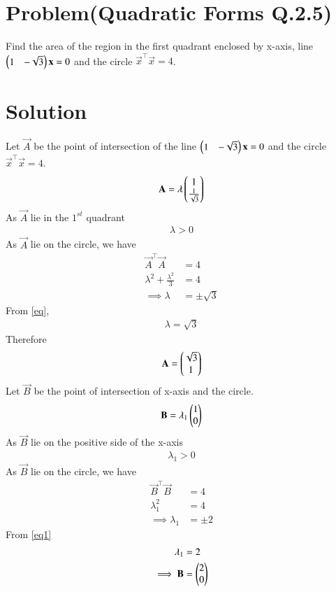 \documentclass[journal,12pt,twocolumn]{IEEEtran}
\begin{document}
\section{Problem(Quadratic Forms Q.2.5)}
Find the area of the region in the first quadrant enclosed by x-axis, line $\begin{pmatrix}1 & -\sqrt{3}\end{pmatrix}\mathbf{x}=0$ and the circle $\vec{x}^\top\vec{x}=4$.
\section{Solution}
Let $\vec{A}$ be the point of intersection of the line $\begin{pmatrix}1 & -\sqrt{3}\end{pmatrix}\mathbf{x}=0$ and the circle $\vec{x}^\top\vec{x}=4$.
\begin{align}
    \mathbf{A}=\lambda\begin{pmatrix}1\\ \frac{1}{\sqrt{3}}\end{pmatrix}
\end{align}
As $\vec{A}$ lie in the $1^{st}$ quadrant
\begin{align}
\label{eq}
    \lambda > 0
\end{align}
As $\vec{A}$ lie on the circle, we have
\begin{align}
    \vec{A}^\top\vec{A}&=4\\
    \lambda^2+\frac{\lambda^2}{3}&=4\\
    \implies \lambda&=\pm \sqrt{3} 
\end{align}
From \ref{eq},
\begin{align}
    \lambda = \sqrt{3}
\end{align}
Therefore 
\begin{align}
    \mathbf{A}=\begin{pmatrix}\sqrt{3}\\1\end{pmatrix}
\end{align}
Let $\vec{B}$ be the point of intersection of x-axis and the circle.
\begin{align}
    \mathbf{B}=\lambda_1\begin{pmatrix}1\\0\end{pmatrix}
\end{align}
As $\vec{B}$ lie on the positive side of the x-axis 
\begin{align}
    \label{eq1}
    \lambda_1>0
\end{align}
As $\vec{B}$ lie on the circle, we have
\begin{align}
    \vec{B}^\top \vec{B}&=4\\
    \lambda_1^2&=4\\
    \implies \lambda_1 &=\pm 2 
\end{align}
From \ref{eq1}
\begin{align}
    \lambda_1&=2\\
    \implies \mathbf{B}&=\begin{pmatrix}2\\0\end{pmatrix}
\end{align}
\end{document}

